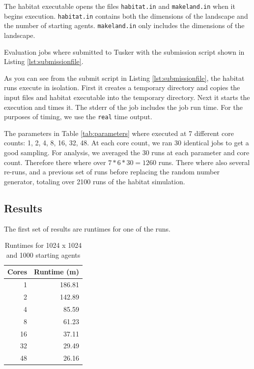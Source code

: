 \documentclass[12pt, notitlepage]{article}
\begin{document}
The habitat executable opens the files \texttt{habitat.in} and \texttt{makeland.in} when it begins execution.  \texttt{habitat.in} contains both the dimensions of the landscape and the number of starting agents.  \texttt{makeland.in} only includes the dimensions of the landscape.

Evaluation jobs where submitted to Tusker with the submission script shown in Listing \ref{lst:submissionfile}.

\begin{figure}[ht]
\centering

\end{figure}

As you can see from the submit script in Listing \ref{lst:submissionfile}, the habitat runs execute in isolation.  First it creates a temporary directory and copies the input files and habitat executable into the temporary directory.  Next it starts the execution and times it.  The stderr of the job includes the job run time.  For the purposes of timing, we use the \texttt{real} time output.

The parameters in Table \ref{tab:parameters} where executed at 7 different core counts: 1, 2, 4, 8, 16, 32, 48.  At each core count, we ran 30 identical jobs to get a good sampling.  For analysis, we averaged the 30 runs at each parameter and core count.  Therefore there where over $7 * 6 * 30 = 1260$ runs.  There where also several re-runs, and a previous set of runs before replacing the random number generator, totaling over 2100 runs of the habitat simulation.

\subsection{Results}

The first set of results are runtimes for one of the runs.

\begin{table}[ht]
\centering
\begin{tabular}{ r | r }
\textbf{Cores} & \textbf{Runtime (m)} \\
\hline \hline
1 & 186.81\\
2 & 142.89\\
4 & 85.59\\
8 & 61.23\\
16 & 37.11\\
32 & 29.49\\
48 & 26.16\\
\end{tabular}
\caption{Runtimes for 1024 x 1024 and 1000 starting agents} \label{tab:runtimes}
\end{table}
\end{document}
